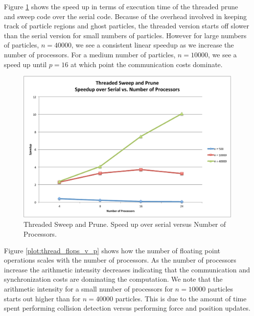 \documentclass[11pt]{article} %
\begin{document}
Figure \ref{plot:thread_speedup_v_p} shows the speed up in terms
of execution time of the threaded prune and sweep code over the serial
code. Because of the overhead involved in keeping track of particle
regions and ghost particles, the threaded version starts off slower
than the serial version for small numbers of particles. However for
large numbers of particles, $n=40000$, we see a consistent linear
speedup as we increase the number of processors. For a medium number
of particles, $n=10000$, we see a speed up until $p=16$ at which
point the communication costs dominate. 

\begin{figure}
\begin{centering}
\includegraphics[width=0.5\paperwidth]{figures/thread_speedup_v_p}
\par\end{centering}

\caption{Threaded Sweep and Prune. Speed up over serial versus Number of Processors.}
\label{plot:thread_speedup_v_p}
\end{figure}


Figure \ref{plot:thread_flops_v_p} shows how the number of floating
point operations scales with the number of processors. As the number
of processors increase the arithmetic intensity decreases indicating
that the communication and synchronization costs are dominating the
computation. We note that the arithmetic intensity for a small number
of processors for $n=10000$ particles starts out higher than for
$n=40000$ particles. This is due to the amount of time spent performing
collision detection versus performing force and position updates. 
\end{document}

